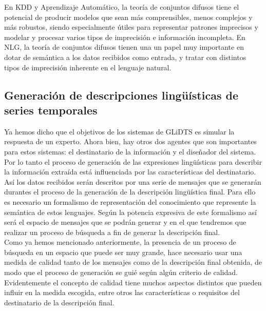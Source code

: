 \documentclass[10pt,a4paper]{article}
\begin{document}
En KDD y Aprendizaje Automático, la teoría de conjuntos difusos tiene el potencial de producir modelos que sean más comprensibles, menos complejos y más robustos, siendo especialmente útiles para representar patrones imprecisos y modelar y procesar varios tipos de imprecisión e información incompleta. En NLG, la teoría de conjuntos difusos tienen una un papel muy importante en dotar de semántica a los datos recibidos como entrada, y tratar con distintos tipos de imprecisión inherente en el lenguaje natural.\\

\subsection{Generación de descripciones lingüísticas de series temporales}

Ya hemos dicho que el objetivos de los sistemas de GLiDTS es simular la respuesta de un experto. Ahora bien, hay otros dos agentes que son importantes para estos sistemas: el destinatario de la información y el diseñador del sistema. Por lo tanto el proceso de generación de las expresiones lingüísticas para describir la información extraída está influenciada por las características del destinatario.\\

Así los datos recibidos serán descritos por una serie de mensajes que se generarán durantes el proceso de la generación de la descripción lingüística final. Para ello es necesario un formalismo de representación del conocimiento que represente la semántica de estos lenguajes. Según la potencia expresiva de este formalismo así será el espacio de mensajes que se podrán generar y en el que tendremos que realizar un proceso de búsqueda a fin de generar la descripción final.\\

Como ya hemos mencionado anteriormente, la presencia de un proceso de búsqueda en un espacio que puede ser muy grande, hace necesario usar una medida de calidad tanto de los mensajes como de la descripción final obtenida, de modo que el proceso de generación se guié según algún criterio de calidad. Evidentemente el concepto de calidad tiene muchos aspectos distintos que pueden influir en la medida escogida, entre otros las características o requisitos del destinatario de la descripción final.\\
\end{document}
